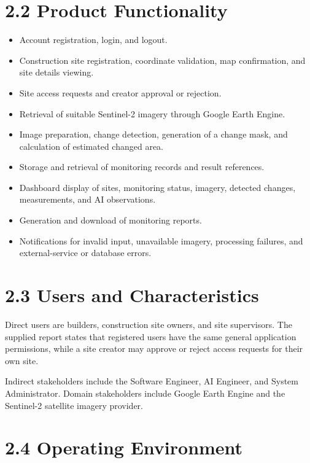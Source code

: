 \documentclass[12pt,a4paper]{report}
\begin{document}
\section{2.2 Product Functionality}\label{product-functionality}

\begin{itemize}
\item
  Account registration, login, and logout.
\item
  Construction site registration, coordinate validation, map
  confirmation, and site details viewing.
\item
  Site access requests and creator approval or rejection.
\item
  Retrieval of suitable Sentinel-2 imagery through Google Earth Engine.
\item
  Image preparation, change detection, generation of a change mask, and
  calculation of estimated changed area.
\item
  Storage and retrieval of monitoring records and result references.
\item
  Dashboard display of sites, monitoring status, imagery, detected
  changes, measurements, and AI observations.
\item
  Generation and download of monitoring reports.
\item
  Notifications for invalid input, unavailable imagery, processing
  failures, and external-service or database errors.
\end{itemize}

\section{2.3 Users and
Characteristics}\label{users-and-characteristics}

Direct users are builders, construction site owners, and site
supervisors. The supplied report states that registered users have the
same general application permissions, while a site creator may approve
or reject access requests for their own site.

Indirect stakeholders include the Software Engineer, AI Engineer, and
System Administrator. Domain stakeholders include Google Earth Engine
and the Sentinel-2 satellite imagery provider.

\section{2.4 Operating Environment}\label{operating-environment}
\end{document}
